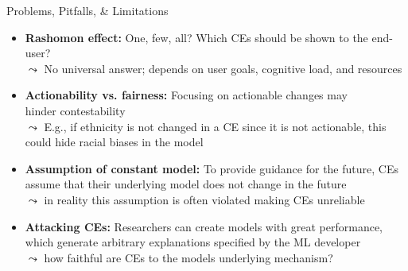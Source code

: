 \documentclass[10pt,compress,t,notes=noshow, xcolor=table]{beamer}
\begin{document}
\begin{frame}{Problems, Pitfalls, \& Limitations}
\begin{itemize}[<+->]
    \item \textbf{Rashomon effect:} One, few, all? Which CEs should be shown to the end-user?\\
    $\leadsto$ No universal answer; depends on user goals, cognitive load, and resources
    \item \textbf{Actionability vs. fairness:} Focusing on actionable changes may \\hinder contestability\\
$\leadsto$ E.g., if ethnicity is not changed in a CE since it is not actionable, this could hide racial biases in the model

    \item \textbf{Assumption of constant model:} To provide guidance for the future, CEs assume that their underlying model does not change in the future\\
    $\leadsto$ in reality this assumption is often violated making CEs unreliable 
    \item \textbf{Attacking CEs:} Researchers can create models with great performance, which generate arbitrary explanations specified by the ML developer\\
    $\leadsto$ how faithful are CEs to the models underlying mechanism?
\end{itemize}


\end{frame}
\end{document}
